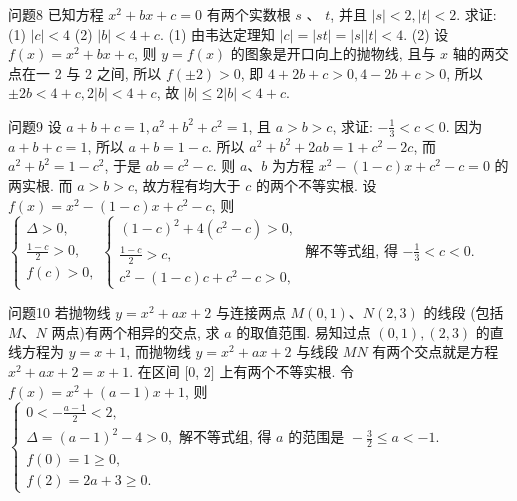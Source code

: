 问题8 已知方程 $x^2+b x+c=0$ 有两个实数根 $s$ 、 $t$, 并且 $|s|<2,|t|<2$. 求证:
(1) $|c|<4$
(2) $|b|<4+c$.
(1) 由韦达定理知 $|c|=|s t|=|s||t|<4$. 
(2) 设 $f(x)=x^2+ b x+c$, 则 $y=f(x)$ 的图象是开口向上的抛物线, 且与 $x$ 轴的两交点在一 2 与 2 之间, 所以 $f( \pm 2)>0$, 即 $4+2 b+c>0,4-2 b+c>0$, 所以 $\pm 2 b<4+ c, 2|b|<4+c$, 故 $|b| \leqslant 2|b|<4+c$.



问题9 设 $a+b+c=1, a^2+b^2+c^2=1$, 且 $a>b>c$, 求证: $-\frac{1}{3}<c<0$.
因为 $a+b+c=1$, 所以 $a+b=1-c$. 所以 $a^2+b^2+2 a b=1+c^2-2 c$, 而 $a^2+b^2=1-c^2$, 于是 $a b=c^2-c$. 则 $a 、 b$ 为方程 $x^2-(1-c) x+c^2-c=0$ 的两实根.
而 $a>b>c$, 故方程有均大于 $c$ 的两个不等实根.
设 $f(x)=x^2- (1-c) x+c^2-c$, 则 $\left\{\begin{array}{l}\Delta>0, \\ \frac{1-c}{2}>0, \\ f(c)>0,\end{array}\left\{\begin{array}{l}(1-c)^2+4\left(c^2-c\right)>0, \\ \frac{1-c}{2}>c, \\ c^2-(1-c) c+c^2-c>0,\end{array}\right.\right.$ 解不等式组, 得 $-\frac{1}{3}<c<0$.



问题10 若抛物线 $y=x^2+a x+2$ 与连接两点 $M(0,1) 、 N(2,3)$ 的线段 (包括 $M 、 N$ 两点)有两个相异的交点, 求 $a$ 的取值范围.
易知过点 $(0,1),(2,3)$ 的直线方程为 $y=x+1$, 而抛物线 $y= x^2+a x+2$ 与线段 $M N$ 有两个交点就是方程 $x^2+a x+2=x+1$. 在区间 $[0$, $2]$ 上有两个不等实根.
令 $f(x)=x^2+(a-1) x+1$, 则 $\left\{\begin{array}{l}0<-\frac{a-1}{2}<2, \\ \Delta=(a-1)^2-4>0, \text { 解不等式组, 得 } a \text { 的范围是 }-\frac{3}{2} \leqslant a<-1 . \\ f(0)=1 \geqslant 0, \\ f(2)=2 a+3 \geqslant 0 .\end{array}\right.$



